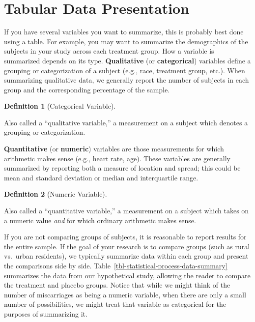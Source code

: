 \documentclass[
  letterpaper,
  DIV=11,
  numbers=noendperiod]{scrreprt}
\theoremstyle{definition}
\newtheorem{definition}{Definition}[chapter]
\theoremstyle{definition}
\theoremstyle{remark}
\begin{document}
\hypertarget{tabular-data-presentation}{%
\section{Tabular Data Presentation}\label{tabular-data-presentation}}

If you have several variables you want to summarize, this is probably
best done using a table. For example, you may want to summarize the
demographics of the subjects in your study across each treatment group.
How a variable is summarized depends on its type. \textbf{Qualitative}
(or \textbf{categorical}) variables define a grouping or categorization
of a subject (e.g., race, treatment group, etc.). When summarizing
qualitative data, we generally report the number of subjects in each
group and the corresponding percentage of the sample.

\begin{definition}[Categorical
Variable]\protect\hypertarget{def-categorical-variable}{}\label{def-categorical-variable}

Also called a ``qualitative variable,'' a measurement on a subject which
denotes a grouping or categorization.

\end{definition}

\textbf{Quantitative} (or \textbf{numeric}) variables are those
measurements for which arithmetic makes sense (e.g., heart rate, age).
These variables are generally summarized by reporting both a measure of
location and spread; this could be mean and standard deviation or median
and interquartile range.

\begin{definition}[Numeric
Variable]\protect\hypertarget{def-numeric-variable}{}\label{def-numeric-variable}

Also called a ``quantitative variable,'' a measurement on a subject
which takes on a numeric value \emph{and} for which ordinary arithmetic
makes sense.

\end{definition}

If you are not comparing groups of subjects, it is reasonable to report
results for the entire sample. If the goal of your research is to
compare groups (such as rural vs.~urban residents), we typically
summarize data within each group and present the comparisons side by
side. Table~\ref{tbl-statistical-process-data-summary} summarizes the
data from our hypothetical study, allowing the reader to compare the
treatment and placebo groups. Notice that while we might think of the
number of miscarriages as being a numeric variable, when there are only
a small number of possibilities, we might treat that variable as
categorical for the purposes of summarizing it.
\end{document}
